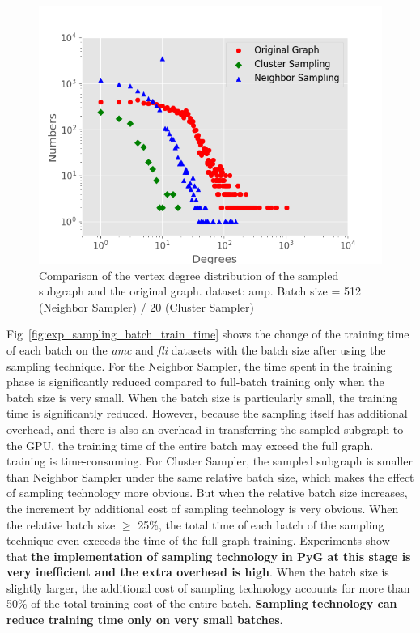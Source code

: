 {\begin{figure}
    \centering
    \includegraphics[width=0.7\columnwidth]{figs/experiments/exp_sampling_minibatch_degrees_distribution_amazon-photo.png}
    \caption{Comparison of the vertex degree distribution of the sampled subgraph and the original graph. dataset: amp. Batch size = 512 (Neighbor Sampler) / 20 (Cluster Sampler)}
    \label{fig:exp_sampling_minibatch_degrees_distribution}
\end{figure}

Fig~\ref{fig:exp_sampling_batch_train_time} shows the change of the training time of each batch on the \textit{amc} and \textit{fli} datasets with the batch size after using the sampling technique.
For the Neighbor Sampler, the time spent in the training phase is significantly reduced compared to full-batch training only when the batch size is very small. 
When the batch size is particularly small, the training time is significantly reduced. However, because the sampling itself has additional overhead, 
and there is also an overhead in transferring the sampled subgraph to the GPU, the training time of the entire batch may exceed the full graph. 
training is time-consuming. For Cluster Sampler, the sampled subgraph is smaller than Neighbor Sampler under the same relative batch size,
which makes the effect of sampling technology more obvious. But when the relative batch size increases, 
the increment by additional cost of sampling technology is very obvious. When the relative batch size $\geq$ 25\%,
the total time of each batch of the sampling technique even exceeds the time of the full graph training. 
Experiments show that \textbf{the implementation of sampling technology in PyG at this stage is very inefficient and the extra overhead is high}.
When the batch size is slightly larger, the additional cost of sampling technology accounts for more than 50\% of the total training cost of the entire batch.
\textbf{Sampling technology can reduce training time only on very small batches}.

}
